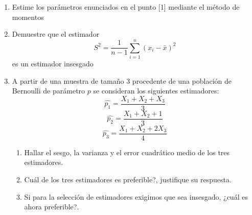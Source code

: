 \documentclass[base=hide,11pt]{elegantbook}
\begin{document}
{\begin{enumerate}
\item Estime los parámetros enunciados en el punto [1] mediante el método de momentos
\item Demuestre que el estimador $$S^{2}=\frac{1}{n-1}\sum_{i=1}^{n} (x_{i}-\bar{x})^{2}$$ es un estimador insesgado

\item A partir de una muestra de tamaño 3 procedente de una población de Bernoulli de parámetro $p$ se consideran los siguientes estimadores:
					$$\widehat{p_{1}}=\frac{X_{1}+X_{2}+X_{3}}{3}$$
					$$\widehat{p_{2}}=\frac{X_{1}+X_{2}+1}{3}$$
					$$\widehat{p_{3}}=\frac{X_{1}+X_{2}+2X_{3}}{4}$$
\begin{enumerate} 
\item Hallar el sesgo, la varianza y el error cuadrático medio de los tres estimadores.
\item Cuál de los tres estimadores es preferible?, justifique su respuesta.
\item Si para la selección de estimadores exigimos que sea insesgado, ¿cuál es ahora preferible?.
\end{enumerate}
					

\end{enumerate}}
\end{document}
